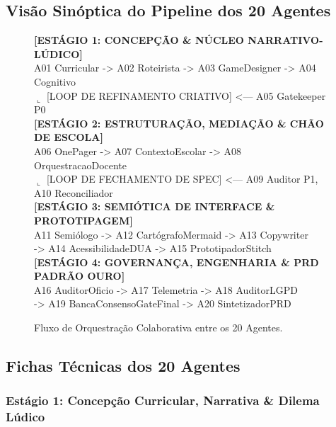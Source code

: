 \documentclass[11pt,a4paper]{article}
\begin{document}
\subsection{Vis\~ao Sin\'optica do Pipeline dos 20 Agentes}

\begin{figure}[htbp]
\centering
\begin{tcolorbox}[colback=GrayBg, colframe=SteelBlue, arc=4pt, boxrule=1pt]
\small\ttfamily
\textbf{[ESTÁGIO 1: CONCEPÇÃO \& NÚCLEO NARRATIVO-LÚDICO]}\\
A01 Curricular -> A02 Roteirista -> A03 GameDesigner -> A04 Cognitivo\\
\quad $\llcorner$ [LOOP DE REFINAMENTO CRIATIVO] <--- A05 Gatekeeper P0\\[0.3cm]
\textbf{[ESTÁGIO 2: ESTRUTURAÇÃO, MEDIAÇÃO \& CHÃO DE ESCOLA]}\\
A06 OnePager -> A07 ContextoEscolar -> A08 OrquestracaoDocente\\
\quad $\llcorner$ [LOOP DE FECHAMENTO DE SPEC] <--- A09 Auditor P1, A10 Reconciliador\\[0.3cm]
\textbf{[ESTÁGIO 3: SEMIÓTICA DE INTERFACE \& PROTOTIPAGEM]}\\
A11 Semiólogo -> A12 CartógrafoMermaid -> A13 Copywriter\\
\quad -> A14 AcessibilidadeDUA -> A15 PrototipadorStitch\\[0.3cm]
\textbf{[ESTÁGIO 4: GOVERNANÇA, ENGENHARIA \& PRD PADRÃO OURO]}\\
A16 AuditorOficio -> A17 Telemetria -> A18 AuditorLGPD\\
\quad -> A19 BancaConsensoGateFinal -> A20 SintetizadorPRD
\end{tcolorbox}
\caption{Fluxo de Orquestra\c{c}\~ao Colaborativa entre os 20 Agentes.}
\end{figure}

\subsection{Fichas T\'ecnicas dos 20 Agentes}

\subsubsection{Est\'agio 1: Concep\c{c}\~ao Curricular, Narrativa \& Dilema L\'udico}
\end{document}
